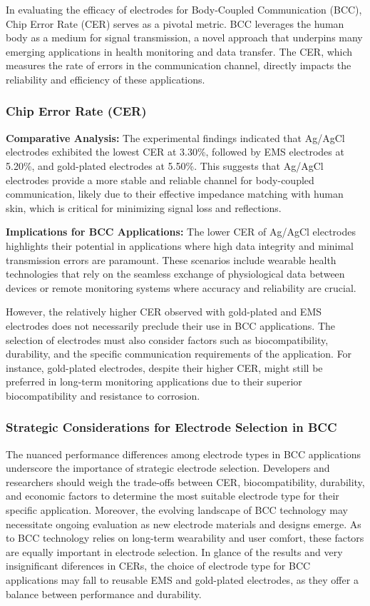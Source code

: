 \documentclass[conference]{IEEEtran}
\begin{document}
In evaluating the efficacy of electrodes for Body-Coupled Communication (BCC), Chip Error Rate (CER) serves as a pivotal metric. BCC leverages the human body as a medium for signal transmission, a novel approach that underpins many emerging applications in health monitoring and data transfer. The CER, which measures the rate of errors in the communication channel, directly impacts the reliability and efficiency of these applications.

\subsubsection{Chip Error Rate (CER)}

\textbf{Comparative Analysis:} The experimental findings indicated that Ag/AgCl electrodes exhibited the lowest CER at 3.30\%, followed by EMS electrodes at 5.20\%, and gold-plated electrodes at 5.50\%. This suggests that Ag/AgCl electrodes provide a more stable and reliable channel for body-coupled communication, likely due to their effective impedance matching with human skin, which is critical for minimizing signal loss and reflections.

\textbf{Implications for BCC Applications:} The lower CER of Ag/AgCl electrodes highlights their potential in applications where high data integrity and minimal transmission errors are paramount. These scenarios include wearable health technologies that rely on the seamless exchange of physiological data between devices or remote monitoring systems where accuracy and reliability are crucial.

However, the relatively higher CER observed with gold-plated and EMS electrodes does not necessarily preclude their use in BCC applications. The selection of electrodes must also consider factors such as biocompatibility, durability, and the specific communication requirements of the application. For instance, gold-plated electrodes, despite their higher CER, might still be preferred in long-term monitoring applications due to their superior biocompatibility and resistance to corrosion. 

\subsubsection{Strategic Considerations for Electrode Selection in BCC}

The nuanced performance differences among electrode types in BCC applications underscore the importance of strategic electrode selection. Developers and researchers should weigh the trade-offs between CER, biocompatibility, durability, and economic factors to determine the most suitable electrode type for their specific application. Moreover, the evolving landscape of BCC technology may necessitate ongoing evaluation as new electrode materials and designs emerge. As to BCC technology relies on long-term wearability and user comfort, these factors are equally important in electrode selection. In glance of the results and very insignificant diferences in CERs, the choice of electrode type for BCC applications may fall to reusable EMS and gold-plated electrodes, as they offer a balance between performance and durability.
\end{document}
